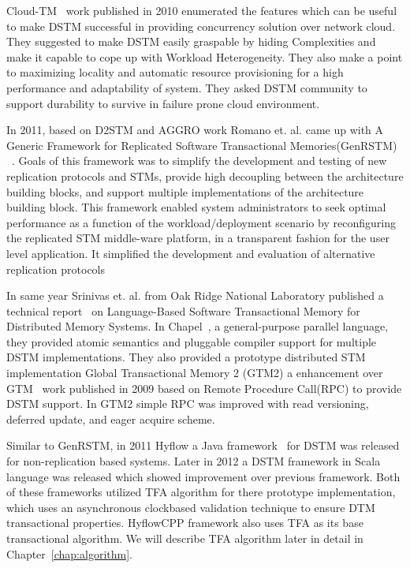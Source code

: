 \documentclass[12pt,english]{report}
\begin{document}
Cloud-TM~\cite{Romano:2010:CHC:1773912.1773914} work published in 2010 enumerated the features which can be useful to make DSTM successful in providing concurrency solution over network cloud. They suggested to make DSTM easily graspable by hiding Complexities and make it capable to cope up with Workload Heterogeneity. They also make a point to maximizing locality and automatic resource provisioning for a high performance and adaptability of system. They asked DSTM community to support durability to survive in failure prone cloud environment. 

In 2011, based on D2STM and AGGRO work Romano et. al. came up with A Generic Framework for Replicated Software Transactional Memories(GenRSTM) ~\cite{GenRSTM:6038614}. Goals of this framework was to simplify the development and testing of new replication protocols and STMs, provide high decoupling between the architecture building blocks, and support multiple implementations of the architecture building block. This framework enabled system administrators to seek optimal performance as a function of the workload/deployment scenario by reconfiguring the replicated STM middle-ware platform, in a transparent fashion for the
user level application. It simplified the development and evaluation of alternative replication protocols

In same year Srinivas et. al. from Oak Ridge National Laboratory published a technical report~\cite{sridharan2011scalable} on Language-Based Software Transactional Memory for Distributed Memory Systems. In Chapel~\cite{chapel:Language}, a general-purpose parallel language, they provided atomic semantics and pluggable compiler support for multiple DSTM implementations. They also provided a prototype distributed STM implementation Global Transactional Memory 2 (GTM2) a enhancement over GTM~\cite{sridharan2009scalable} work published in 2009 based on Remote Procedure Call(RPC) to provide DSTM  support. In GTM2 simple RPC was improved with read versioning, deferred update, and eager acquire scheme.

Similar to GenRSTM, in 2011 Hyflow a Java framework~\cite{Saad:2011:HHP:1996130.1996167} for DSTM was released for non-replication based systems. Later in 2012 a DSTM framework in Scala language was released which showed improvement over previous framework. Both of these frameworks utilized TFA algorithm for there prototype implementation, which uses an asynchronous clockbased validation technique to ensure DTM transactional properties. HyflowCPP framework also uses TFA as its base transactional algorithm. We will describe TFA algorithm later in detail in Chapter~\ref{chap:algorithm}.
\end{document}
